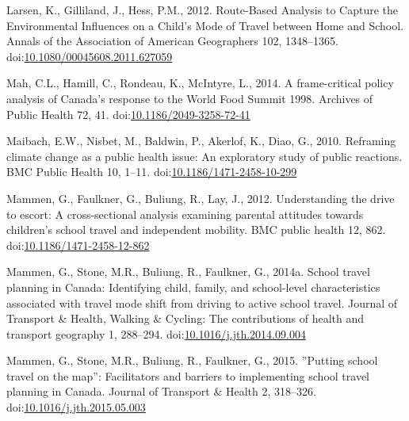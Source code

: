 \documentclass[]{elsarticle} %
\newlength{\cslhangindent}
\newlength{\cslentryspacingunit} %
\newenvironment{CSLReferences}[2] %
 {%
  \setlength{\parindent}{0pt}
  \ifodd #1
  \let\oldpar\par
  \def\par{\hangindent=\cslhangindent\oldpar}
  \fi
  \setlength{\parskip}{#2\cslentryspacingunit}
 }%
 {}
\begin{document}
\begin{CSLReferences}{1}{0}
\leavevmode{}%
Larsen, K., Gilliland, J., Hess, P.M., 2012. Route-{Based Analysis} to
{Capture} the {Environmental Influences} on a {Child}'s {Mode} of
{Travel} between {Home} and {School}. Annals of the Association of
American Geographers 102, 1348--1365.
doi:\href{https://doi.org/10.1080/00045608.2011.627059}{10.1080/00045608.2011.627059}

\leavevmode{}%
Mah, C.L., Hamill, C., Rondeau, K., McIntyre, L., 2014. A frame-critical
policy analysis of {Canada}'s response to the {World Food Summit}
1998. Archives of Public Health 72, 41.
doi:\href{https://doi.org/10.1186/2049-3258-72-41}{10.1186/2049-3258-72-41}

\leavevmode{}%
Maibach, E.W., Nisbet, M., Baldwin, P., Akerlof, K., Diao, G., 2010.
Reframing climate change as a public health issue: An exploratory study
of public reactions. BMC Public Health 10, 1--11.
doi:\href{https://doi.org/10.1186/1471-2458-10-299}{10.1186/1471-2458-10-299}

\leavevmode{}%
Mammen, G., Faulkner, G., Buliung, R., Lay, J., 2012. Understanding the
drive to escort: A cross-sectional analysis examining parental attitudes
towards children's school travel and independent mobility. BMC public
health 12, 862.
doi:\href{https://doi.org/10.1186/1471-2458-12-862}{10.1186/1471-2458-12-862}

\leavevmode{}%
Mammen, G., Stone, M.R., Buliung, R., Faulkner, G., 2014a. School travel
planning in {Canada}: Identifying child, family, and school-level
characteristics associated with travel mode shift from driving to active
school travel. Journal of Transport \& Health, Walking \& {Cycling}: The
contributions of health and transport geography 1, 288--294.
doi:\href{https://doi.org/10.1016/j.jth.2014.09.004}{10.1016/j.jth.2014.09.004}

\leavevmode{}%
Mammen, G., Stone, M.R., Buliung, R., Faulkner, G., 2015. ''{Putting}
school travel on the map'': Facilitators and barriers to implementing
school travel planning in {Canada}. Journal of Transport \& Health 2,
318--326.
doi:\href{https://doi.org/10.1016/j.jth.2015.05.003}{10.1016/j.jth.2015.05.003}


\end{CSLReferences}
\end{document}

